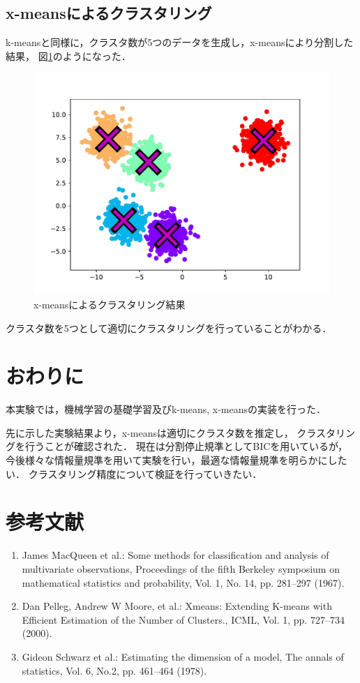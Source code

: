 \documentclass[10pt,a4j,twocolumn]{ltjsarticle}
\def\figref#1{図\ref{#1}}
\begin{document}
\subsection{x-meansによるクラスタリング}
k-meansと同様に，クラスタ数が5つのデータを生成し，x-meansにより分割した結果，
\figref{img:xmeans-after}のようになった．
\begin{figure}[htbp]
  \begin{center}
    \includegraphics[width=0.8\linewidth]{img/x-means/after.pdf}
    \caption{x-meansによるクラスタリング結果}
    \label{img:xmeans-after}
  \end{center}
\end{figure}

クラスタ数を5つとして適切にクラスタリングを行っていることがわかる．

\section{おわりに}
本実験では，機械学習の基礎学習及びk-means, x-meansの実装を行った．

先に示した実験結果より，x-meansは適切にクラスタ数を推定し，
クラスタリングを行うことが確認された．
現在は分割停止規準としてBICを用いているが，
今後様々な情報量規準を用いて実験を行い，最適な情報量規準を明らかにしたい．
クラスタリング精度について検証を行っていきたい．

\section{参考文献}
\begin{enumerate}
\renewcommand{\labelenumi}{\arabic{enumi})}
  \item James MacQueen et al.: 
    Some methods for classification and analysis of multivariate observations,
    Proceedings of the fifth Berkeley symposium on mathematical statistics and probability, 
    Vol. 1, No. 14, pp. 281--297 (1967).
  \item Dan Pelleg, Andrew W Moore, et al.:
    Xmeans: Extending K-means with Efficient Estimation of the Number of Clusters.,
    ICML, Vol. 1, pp. 727--734 (2000).
  \item Gideon Schwarz et al.:
    Estimating the dimension of a model,
    The annals of statistics, Vol. 6, No.2, pp. 461--464 (1978).
\end{enumerate}
\end{document}
